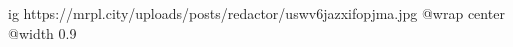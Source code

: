  
 
 
 
 

\ifcmt
  ig https://mrpl.city/uploads/posts/redactor/uswv6jazxifopjma.jpg
  @wrap center
  @width 0.9
\fi
